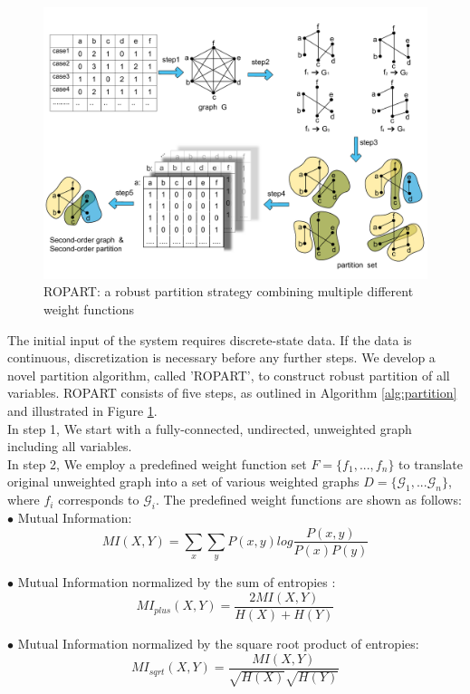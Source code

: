 \begin{figure}[th]
\centering
\includegraphics[width=1.0\textwidth]{partition.pdf}
\caption{ROPART: a robust partition strategy combining multiple different weight functions}
\label{fig:ropart}
\end{figure}

The initial input of the \lama{} system requires discrete-state data. If the data is continuous, discretization is necessary before any further steps. We develop a novel partition algorithm, called 'ROPART', to construct robust partition of all variables. ROPART consists of five steps, as outlined in Algorithm \ref{alg:partition} and illustrated in Figure \ref{fig:ropart}.\\

In step 1, We start with a fully-connected, undirected, unweighted graph including all variables. \\

In step 2, We employ a predefined weight function set $F=\{f_{1},...,f_{n}\}$ to translate original unweighted graph into a set of various weighted graphs $D=\{\mathcal{G}_{1},...\mathcal{G}_{n}\}$, where $f_{i}$ corresponds to $\mathcal{G}_{i}$. The predefined weight functions are shown as follows: \\

$\bullet$ Mutual Information:
\[MI(X,Y)=\sum_{x}\sum_{y}P(x,y)log\frac{P(x,y)}{P(x)P(y)}\]

$\bullet$ Mutual Information normalized by the sum of entropies \cite{WittenF05}:
\[MI_{plus}(X,Y)=\frac{2MI(X,Y)}{H(X)+H(Y)}\]

$\bullet$ Mutual Information normalized by the square root product of entropies\cite{DBLP:conf/aaai/StrehlG02}:
\[MI_{sqrt}(X,Y)=\frac{MI(X,Y)}{\sqrt{H(X)}\sqrt{H(Y)}}\]

